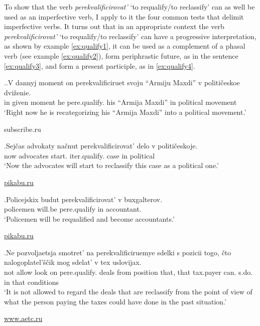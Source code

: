 To show that the verb \textit{perekvalificirovat'} `to requalify/to reclassify' can as well be used as an imperfective verb, I apply to it the four common tests that delimit imperfective verbs. It turns out that in an appropriate context the verb \textit{perekvalificirovat'} `to requalify/to reclassify' can have a progressive interpretation, as shown by example \ref{ex:qualify1}, it can be used as a complement of a phasal verb (see example \ref{ex:qualify2}), form periphrastic future, as in the sentence \ref{ex:qualify3}, and form a present participle, as in \ref{ex:qualify4}. 

\ex.\label{ex:qualify}\ag.\label{ex:qualify1}V dannyj moment on perekvalificiruet\textsuperscript{\IPF} svoju {``Armiju Maxdi''} v politi\v{c}eskoe dvi\v{z}enie.\\
in given moment he pere.qualify. his {``Armija Maxdi''} in political movement\\
\trans `Right now he is recategorizing his ``Armija Maxdi'' into a political movement.' 
\begin{flushright}
\vspace{-0.5em}
subscribe.ru
\end{flushright}
\bg.\label{ex:qualify2}Sej\v{c}as advokaty na\v{c}nut perekvalificirovat'\textsuperscript{\IPF} delo v politi\v{c}eskoje.\\
now advocates start. iter.qualify. case in political\\
\trans `Now the advocates will start to reclassify this case as a political one.'
\begin{flushright}
\vspace{-0.5em}
\url{pikabu.ru}
\end{flushright}
\bg.\label{ex:qualify3}Policejskix budut perekvalificirovat'\textsuperscript{\IPF} v buxgalterov.\\	
policemen will.be pere.qualify in accountant.\\
\trans `Policemen will be requalified and become accountants.'
\begin{flushright}
\vspace{-0.5em}
\url{pikabu.ru}
\end{flushright}
\bg.\label{ex:qualify4}Ne pozvoljaetsja smotret’ na perekvalificiruemye sdelki s pozicii togo, \v{c}to nalogoplatel’\v{s}\v{c}ik mog sdelat’ v tex uslovijax.\\
not allow look on pere.qualify. deals from position that, that tax.payer can. s.do. in that conditions\\
\trans `It is not allowed to regard the deals that are reclassify from the point of view of what the person paying the taxes could have done in the past situation.'
\begin{flushright}
\vspace{-0.5em}
\url{www.aetc.ru}
\end{flushright}

